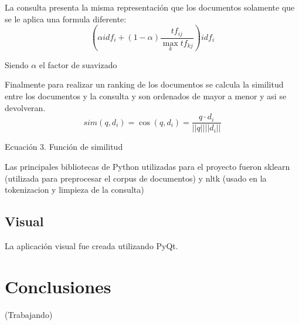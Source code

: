 \documentclass[runningheads]{llncs}
\begin{document}
La consulta presenta la misma representación que los documentos solamente que se le aplica una formula diferente:
\begin{equation}
	(\alpha idf_i + (1-\alpha)\frac{tf_{ij}}{\max_{k} tf_{kj}}) idf_i
\end{equation}

Siendo $\alpha$ el factor de suavizado

Finalmente para realizar un ranking de los documentos se calcula la similitud entre los documentos y la consulta y son ordenados de mayor a menor y asi se devolveran.
\begin{equation}
	sim(q,d_i) = \cos(q, d_i) = \frac{q \cdot d_i}{||q|| ||d_i||}
\end{equation}

Ecuación 3. Función de similitud




Las principales bibliotecas de Python utilizadas para el proyecto fueron sklearn (utilizada para preprocesar el corpus de documentos) y nltk (usado en la tokenizacion y limpieza de la consulta)

\subsection*{Visual}
La aplicación visual fue creada utilizando PyQt.

\section*{Conclusiones}
(Trabajando)
\end{document}
